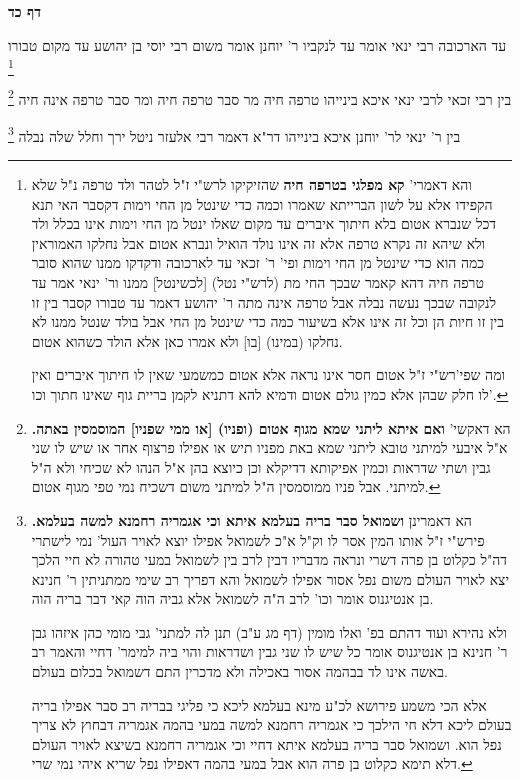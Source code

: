 \documentclass[12pt, openany]{book}
\newcommand{\sethebfont}{
\fontsize{10.5pt}{21.0pt} \selectfont
}
\newcommand{\twocol}[1]{
	{\sethebfont \begin{multicols}{2}
			#1
	\end{multicols}}	
}
\newcommand{\sectname}{}
\newcommand{\newsection}[1]{
	\addcontentsline{toc}{section}{#1}
	\renewcommand{\sectname}{#1}	
	\vspace{-\baselineskip}
	\begin{center}
		\textbf{%
\fontsize{16pt}{16pt}\selectfont
			#1}
	\end{center}
	\vspace{-\baselineskip}
	\nopagebreak
}
\newcommand{\footnotecomment}[1]{\footnote{#1}}
\newcommand{\commenta}[1]{\footnotecomment{#1}}
\begin{document}
\newsection{דף כד}
\twocol{עד הארכובה  רבי ינאי אומר  עד לנקביו  ר' יוחנן אומר משום רבי יוסי בן יהושע  עד מקום טבורו 
\commenta{ והא דאמרי' \textbf{קא מפלגי בטרפה חיה}  שהזיקיקו לרש"י ז"ל לטהר ולד טרפה נ"ל שלא הקפידו אלא על לשון הברייתא שאמרו וכמה כדי שינטל מן החי וימות דקסבר האי תנא דכל שנברא אטום בלא חיתוך איברים עד מקום שאלו ינטל מן החי וימות אינו בכלל ולד ולא שיהא זה נקרא טרפה אלא זה אינו נולד הואיל ונברא אטום אבל נחלקו האמוראין כמה הוא כדי שינטל מן החי וימות ופי' ר' זכאי עד לארכובה ודקדקו ממנו שהוא סובר טרפה חיה דהא קאמר שבכך החי מת (לרש"י נטל) [לכשינטל] ממנו ור' ינאי אמר עד לנקובה שבכך נעשה נבלה אבל טרפה אינה מתה ר' יהושע דאמר עד טבורו קסבר בין זו בין זו חיות הן וכל זה אינו אלא בשיעור כמה כדי שינטל מן החי אבל בולד שנטל ממנו לא נחלקו (במינו) [בו] ולא אמרו כאן אלא הולד כשהוא אטום.\par  ומה שפי'רש"י ז"ל אטום חסר אינו נראה אלא אטום כמשמעי שאין לו חיתוך איברים ואין לו חלק שבהן אלא כמין גולם אטום ודמיא להא דתניא לקמן בריית גוף שאינו חתוך וכו'. }

בין רבי זכאי לרבי ינאי איכא בינייהו טרפה חיה מר סבר  טרפה חיה ומר סבר  טרפה אינה חיה 
\commenta{ הא דאקשי' \textbf{ואם איתא ליתני שמא מגוף אטום (ופניו) [או ממי שפניו] המוסמסין באתה.}  א"ל איבעי למיתני טובא ליתני שמא באת מפניו תיש או אפילו פרצוף אחר או שיש לו שני גבין ושתי שדראות וכמין אפיקותא דדיקלא וכן כיוצא בהן א"ל הנהו לא שכיחי ולא ה"ל למיתני. אבל פניו ממוסמסין ה"ל למיתני משום דשכיח נמי טפי מגוף אטום. }

בין ר' ינאי לר' יוחנן איכא בינייהו דר"א דאמר רבי אלעזר  ניטל ירך וחלל שלה נבלה 
\commenta{הא דאמרינן \textbf{ושמואל סבר בריה בעלמא איתא וכי אגמריה רחמנא למשה בעלמא.}  פירש"י ז"ל אותו המין אסר לו וק"ל א"כ לשמואל אפילו יוצא לאויר העול' נמי לישתרי דה"ל כקלוט בן פרה דשרי ונראה מדבריו דבין לרב בין לשמואל במעי טהורה לא חיי הלכך יצא לאויר העולם משום נפל אסור אפילו לשמואל והא דפריך רב שימי ממתניתין ר' חנינא בן אנטיגנוס אומר וכו' לרב ה"ה לשמואל אלא גביה הוה קאי דבר בריה הוה.\par ולא נהירא ועוד דהתם בפ' ואלו מומין (דף מג ע"ב) תנן לה למתני' גבי מומי כהן איזהו גבן ר' חנינא בן אנטיגנוס אומר כל שיש לו שני גבין ושדראות והוי ביה למימר' דחיי והאמר רב באשה אינו לד בבהמה אסור באכילה ולא מדכרין התם דשמואל בכלום בעולם.\par  אלא הכי משמע פירושא לכ"ע מינא בעלמא ליכא כי פליגי בבריה רב סבר אפילו בריה בעולם ליכא דלא חי הילכך כי אגמריה רחמנא למשה במעי בהמה אגמריה דבחוץ לא צריך נפל הוא. ושמואל סבר בריה בעלמא איתא דחיי וכי אגמריה רחמנא בשיצא לאויר העולם דלא תימא כקלוט בן פרה הוא אבל במעי בהמה דאפילו נפל שריא איהי נמי שרי. }

}
\end{document}
